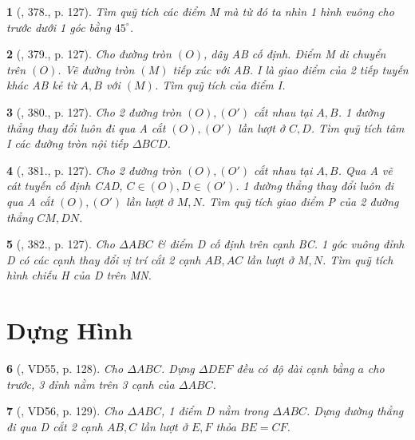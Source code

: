\documentclass{article}
\newtheorem{baitoan}{}
\begin{document}
\begin{baitoan}[\cite{Binh_Toan_9_tap_2}, 378., p. 127]
	Tìm quỹ tích các điểm M mà từ đó ta nhìn 1 hình vuông cho trước dưới 1 góc bằng $45^\circ$.
\end{baitoan}

\begin{baitoan}[\cite{Binh_Toan_9_tap_2}, 379., p. 127]
	Cho đường tròn $(O)$, dây AB cố định. Điểm M di chuyển trên $(O)$. Vẽ đường tròn $(M)$ tiếp xúc với AB. I là giao điểm của 2 tiếp tuyến khác AB kẻ từ $A,B$ với $(M)$. Tìm quỹ tích của điểm I.
\end{baitoan}

\begin{baitoan}[\cite{Binh_Toan_9_tap_2}, 380., p. 127]
	Cho 2 đường tròn $(O),(O')$ cắt nhau tại $A,B$. 1 đường thẳng thay đổi luôn đi qua A cắt $(O),(O')$ lần lượt ở $C,D$. Tìm quỹ tích tâm I các đường tròn nội tiếp $\Delta BCD$.
\end{baitoan}

\begin{baitoan}[\cite{Binh_Toan_9_tap_2}, 381., p. 127]
	Cho 2 đường tròn $(O),(O')$ cắt nhau tại $A,B$. Qua A vẽ cát tuyến cố định CAD, $C\in(O),D\in(O')$. 1 đường thẳng thay đổi luôn đi qua A cắt $(O),(O')$ lần lượt ở $M,N$. Tìm quỹ tích giao điểm P của 2 đường thẳng $CM,DN$.
\end{baitoan}

\begin{baitoan}[\cite{Binh_Toan_9_tap_2}, 382., p. 127]
	Cho $\Delta ABC$ \& điểm D cố định trên cạnh BC. 1 góc vuông đỉnh D có các cạnh thay đổi vị trí cắt 2 cạnh $AB,AC$ lần lượt ở $M,N$. Tìm quỹ tích hình chiếu H của D trên MN.
\end{baitoan}


\section{Dựng Hình}

\begin{baitoan}[\cite{Binh_Toan_9_tap_2}, VD55, p. 128]
	Cho $\Delta ABC$. Dựng $\Delta DEF$ đều có độ dài cạnh bằng $a$ cho trước, 3 đỉnh nằm trên 3 cạnh của $\Delta ABC$.
\end{baitoan}

\begin{baitoan}[\cite{Binh_Toan_9_tap_2}, VD56, p. 129]
	Cho $\Delta ABC$, 1 điểm D nằm trong $\Delta ABC$. Dựng đường thẳng đi qua D cắt 2 cạnh $AB,C$ lần lượt ở $E,F$ thỏa $BE = CF$.
\end{baitoan}
\end{document}
